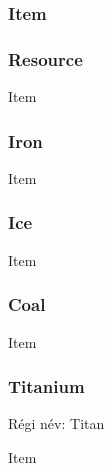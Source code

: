 \documentclass[../../projlab]{subfiles}
\begin{document}
\subsubsection{Item}
\begin{class-template-attribute}
\end{class-template-attribute}
\begin{class-template-method}
\end{class-template-method}

\subsubsection{Resource}
\begin{class-template-baseclass}
    Item
\end{class-template-baseclass}
\begin{class-template-attribute}
\end{class-template-attribute}

\subsubsection{Iron}
\begin{class-template-baseclass}
    Item
\end{class-template-baseclass}

\subsubsection{Ice}
\begin{class-template-baseclass}
    Item
\end{class-template-baseclass}

\subsubsection{Coal}
\begin{class-template-baseclass}
    Item
\end{class-template-baseclass}

\subsubsection{Titanium}
\begin{class-template-responsibility}
    Régi név: Titan
\end{class-template-responsibility}
\begin{class-template-baseclass}
    Item
\end{class-template-baseclass}
\end{document}
